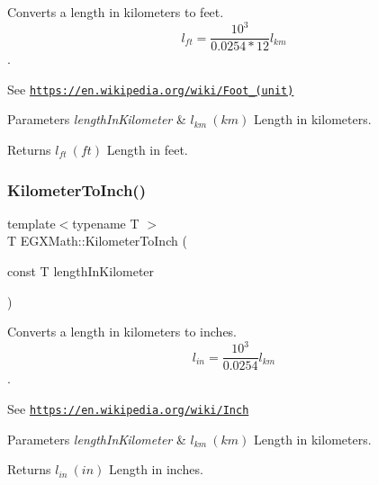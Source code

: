 Converts a length in kilometers to feet. \[ l_{ft}= \frac{10^{3}}{0.0254 * 12} l_{km} \]. 

See \href{https://en.wikipedia.org/wiki/Foot_(unit)}{\tt https\+://en.\+wikipedia.\+org/wiki/\+Foot\+\_\+(unit)} 
\begin{DoxyParams}{Parameters}
{\em length\+In\+Kilometer} & $ l_{km}\ (km)$ Length in kilometers. \\
\hline
\end{DoxyParams}
\begin{DoxyReturn}{Returns}
$ l_{ft}\ (ft)$ Length in feet. 
\end{DoxyReturn}
\mbox{\label{group___e_g_x_math-_conversions-_length_conversions-_kilometer-_imperial_ga6f1d41be3b2039495abff4f256148aa7}} 
\subsubsection{\texorpdfstring{Kilometer\+To\+Inch()}{KilometerToInch()}}
{\footnotesize\ttfamily template$<$typename T $>$ \\
T E\+G\+X\+Math\+::\+Kilometer\+To\+Inch (\begin{DoxyParamCaption}\item[{const T}]{length\+In\+Kilometer }\end{DoxyParamCaption})}



Converts a length in kilometers to inches. \[ l_{in}= \frac{10^{3}}{0.0254} l_{km} \]. 

See \href{https://en.wikipedia.org/wiki/Inch}{\tt https\+://en.\+wikipedia.\+org/wiki/\+Inch} 
\begin{DoxyParams}{Parameters}
{\em length\+In\+Kilometer} & $ l_{km}\ (km)$ Length in kilometers. \\
\hline
\end{DoxyParams}
\begin{DoxyReturn}{Returns}
$ l_{in}\ (in)$ Length in inches. 
\end{DoxyReturn}
\mbox{\label{group___e_g_x_math-_conversions-_length_conversions-_kilometer-_imperial_ga4d25c16818235ceaad64d1119e23e01f}} 
